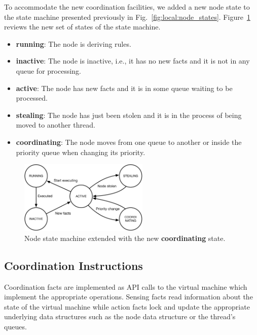 To accommodate the new coordination facilities, we added a new node state to the
state machine presented previously in Fig.~\ref{fig:local:node_states}.
Figure~\ref{fig:implementation:node_states} reviews the new set of states of
the state machine.

\begin{itemize}
   \item \textbf{running}: The node is deriving rules.
   \item \textbf{inactive}: The node is inactive, i.e., it has no new facts and
      it is not in any
   queue for processing.
   \item \textbf{active}: The node has new facts and it is in some queue waiting
   to be processed.
   \item \textbf{stealing}: The node has just been stolen and it is in the process of being
   moved to another thread.
   \item \textbf{coordinating}: The node moves from one queue to another or
      inside the priority queue when changing its priority.
\end{itemize}

\begin{figure}[ht]
   \centering
   \includegraphics[width=0.55\textwidth]{figures/implementation/node_states.pdf}
   \caption{Node state machine extended with the new \textbf{coordinating}
   state.}
   \label{fig:implementation:node_states}
\end{figure}

\subsection{Coordination Instructions}\label{section:coordination:coord_instrs}

Coordination facts are implemented as API calls to the virtual machine which
implement the appropriate operations. Sensing facts read information about the
state of the virtual machine while action facts lock and update the appropriate
underlying data structures such as the node data structure or the thread's
queues.

